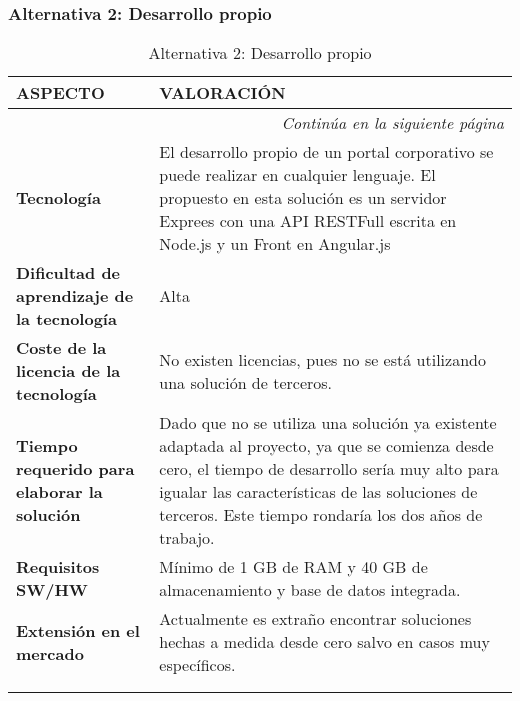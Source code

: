 \subsubsection{Alternativa 2: Desarrollo propio}

\begin{center}
\begin{longtable}{p{4cm} p{8cm}}

\textbf{ASPECTO} & \textbf{VALORACIÓN} \\ \hline \hline
\endfirsthead
\endhead

\multicolumn{2}{r}{\textit{Continúa en la siguiente página}} \\
\endfoot
\endlastfoot

\textbf{Tecnología} & El desarrollo propio de un portal corporativo se puede realizar en cualquier lenguaje. El propuesto en esta solución es un servidor Exprees con una API RESTFull escrita en Node.js y un Front en Angular.js\\ \hline

\textbf{Dificultad de aprendizaje de la tecnología} & Alta\\ \hline

\textbf{Coste de la licencia de la tecnología} &
\par No existen licencias, pues no se está utilizando una solución de terceros.
\\ \hline

\textbf{Tiempo requerido para elaborar la solución} & Dado que no se utiliza una solución ya existente adaptada al proyecto, ya que se comienza desde cero, el tiempo de desarrollo sería muy alto para igualar las características de las soluciones de terceros. Este tiempo rondaría los dos años de trabajo.\\ \hline

\textbf{Requisitos SW/HW} & Mínimo de 1 GB de RAM y 40 GB de almacenamiento y base de datos integrada.\\ \hline

\textbf{Extensión en el mercado} & Actualmente es extraño encontrar soluciones hechas a medida desde cero salvo en casos muy específicos.\\ \hline \hline


\caption{Alternativa 2: Desarrollo propio}\\
\label{tab:alternative2}
\end{longtable}
\end{center}
